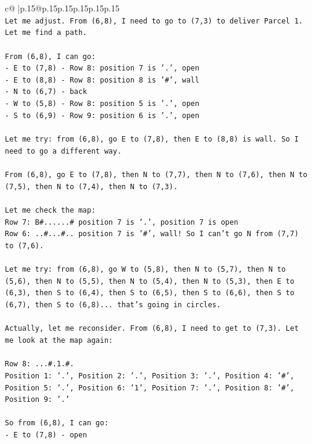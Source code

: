 \documentclass{article}
\begin{document}
{\begin{supertabular}{c@{$\;$}|p{.15\linewidth}@{}p{.15\linewidth}p{.15\linewidth}p{.15\linewidth}p{.15\linewidth}p{.15\linewidth}}
{{{\\ 
\texttt{Let me adjust. From (6,8), I need to go to (7,3) to deliver Parcel 1. Let me find a path.} \\
\\ 
\texttt{From (6,8), I can go:} \\
\texttt{{-} E to (7,8) {-} Row 8: position 7 is '.', open} \\
\texttt{{-} E to (8,8) {-} Row 8: position 8 is '\#', wall} \\
\texttt{{-} N to (6,7) {-} back} \\
\texttt{{-} W to (5,8) {-} Row 8: position 5 is '.', open} \\
\texttt{{-} S to (6,9) {-} Row 9: position 6 is '.', open} \\
\\ 
\texttt{Let me try: from (6,8), go E to (7,8), then E to (8,8) is wall. So I need to go a different way.} \\
\\ 
\texttt{From (6,8), go E to (7,8), then N to (7,7), then N to (7,6), then N to (7,5), then N to (7,4), then N to (7,3).} \\
\\ 
\texttt{Let me check the map:} \\
\texttt{Row 7: B\#......\# position 7 is '.', position 7 is open} \\
\texttt{Row 6: ..\#...\#.. position 7 is '\#', wall! So I can't go N from (7,7) to (7,6).} \\
\\ 
\texttt{Let me try: from (6,8), go W to (5,8), then N to (5,7), then N to (5,6), then N to (5,5), then N to (5,4), then N to (5,3), then E to (6,3), then S to (6,4), then S to (6,5), then S to (6,6), then S to (6,7), then S to (6,8)... that's going in circles.} \\
\\ 
\texttt{Actually, let me reconsider. From (6,8), I need to get to (7,3). Let me look at the map again:} \\
\\ 
\texttt{Row 8: ...\#.1.\#.} \\
\texttt{Position 1: '.', Position 2: '.', Position 3: '.', Position 4: '\#', Position 5: '.', Position 6: '1', Position 7: '.', Position 8: '\#', Position 9: '.'} \\
\\ 
\texttt{So from (6,8), I can go:} \\
\texttt{{-} E to (7,8) {-} open} \\
}}}
\end{supertabular}}
\end{document}
